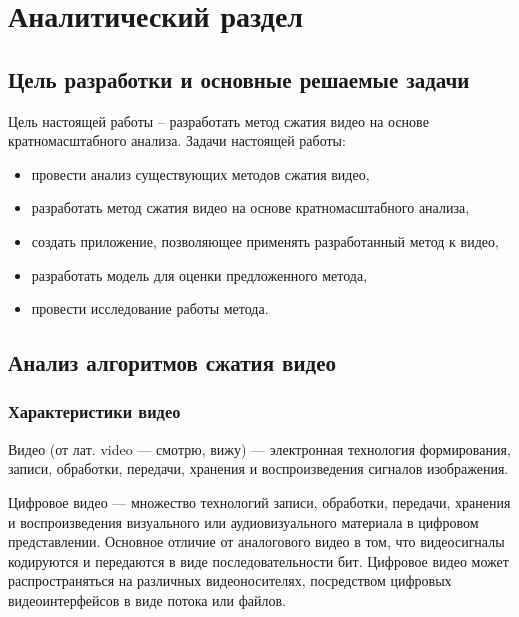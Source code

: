 \chapter{Аналитический раздел}
\label{cha:analysis}

\section{Цель разработки и основные решаемые задачи}

Цель настоящей работы – разработать метод сжатия видео на основе кратномасштабного анализа. 
Задачи настоящей работы:        

\begin{itemize}
\item провести анализ существующих методов сжатия видео,
\item разработать метод сжатия видео на основе кратномасштабного анализа,
\item создать приложение, позволяющее применять разработанный метод к видео,
\item разработать модель для оценки предложенного метода,
\item провести исследование работы метода.
\end{itemize}

\section{Анализ алгоритмов сжатия видео}

\subsection{Характеристики видео}

Видео (от лат. video — смотрю, вижу) — электронная технология формирования, записи, 
обработки, передачи, хранения и воспроизведения сигналов изображения.

Цифровое видео — множество технологий записи, обработки, передачи, 
хранения и воспроизведения визуального или аудиовизуального материала в цифровом представлении. Основное 
отличие от аналогового видео в том, что видеосигналы кодируются и передаются 
в виде последовательности бит. Цифровое видео может распространяться на 
различных видеоносителях, посредством цифровых видеоинтерфейсов в виде потока или файлов.


